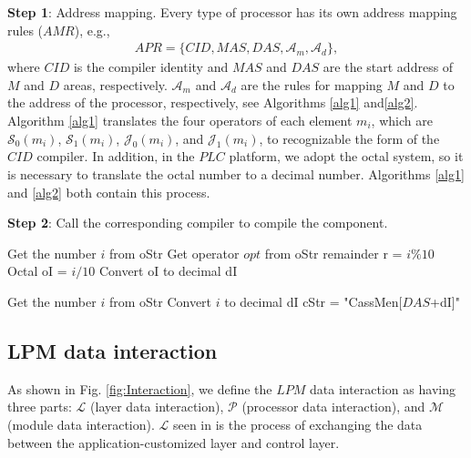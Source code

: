 \documentclass[journal,UTF8]{IEEEtran}
\begin{document}
	\textbf{Step 1}: Address mapping. Every type of processor has its own address mapping rules ($AMR$), e.g.,
	\begin{eqnarray}
	APR = \{CID, MAS, DAS, \mathcal{A}_m, \mathcal{A}_d\},
	\end{eqnarray}
	where $CID$ is the compiler identity and $MAS$ and $DAS$ are the start address of $M$ and $D$ areas, respectively. $\mathcal{A}_m$ and $\mathcal{A}_d$ are the rules for mapping $M$ and $D$ to the address of the processor, respectively, see Algorithms \ref{alg1} and\ref{alg2}. Algorithm \ref{alg1} translates the four operators of each element $m_i$, which are $\mathcal{S}_0(m_i)$, $\mathcal{S}_1(m_i)$, $\mathcal{J}_0(m_i)$, and $\mathcal{J}_1(m_i)$, to recognizable the form of the $CID$ compiler. In addition, in the $PLC$ platform, we adopt the octal system, so it is necessary to translate the octal number to a decimal number. Algorithms \ref{alg1} and \ref{alg2} both contain this process.
	
	
	\textbf{Step 2}: Call the corresponding compiler to compile the component.
	
	
	\begin{algorithm}
		\label{alg1}
		\caption{$\mathcal{A}_m$}%
		Get the number $i$ from oStr\; 
		Get operator $opt$ from oStr\;
		remainder r = $i\%10$\;
		Octal oI =  $i/10$\;
		Convert oI to decimal dI\; 
	\end{algorithm}
	\begin{algorithm}
		\label{alg2}
		\caption{$\mathcal{A}_d$}%
		\KwOut{converted string cStr}%
		Get the number $i$ from oStr\; 
		Convert $i$ to decimal dI\; 
		cStr = "CassMen[$DAS$+dI]"\;
	\end{algorithm}
	
	
	
	\subsection{LPM data interaction}
	As shown in Fig. \ref{fig:Interaction}, we define the $LPM$ data interaction as having three parts: $\mathcal{L}$ (layer data interaction), $\mathcal{P}$ (processor data interaction), and $\mathcal{M}$ (module data interaction). $\mathcal{L}$ seen in \cite{WuA} is the process of exchanging the data between the application-customized layer and control layer.
	
\end{document}
